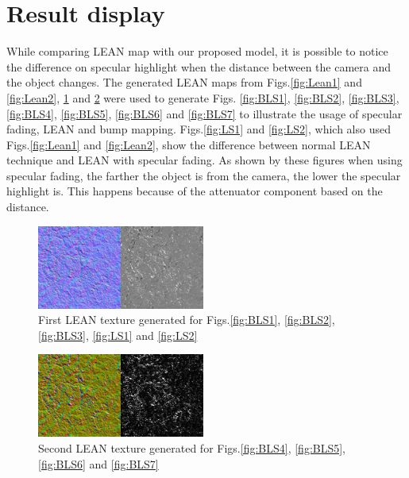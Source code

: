 \documentclass[10pt, conference]{IEEEtran}
\begin{document}
\section{Result display}
\label{sec:results}
%
While comparing LEAN map with our proposed model, it is possible to notice the difference on specular highlight when the distance between the camera and the object changes. The generated LEAN maps from Figs.\ref{fig:Lean1} and \ref{fig:Lean2}, \ref{fig:Lean21} and \ref{fig:Lean22} were used to generate Figs. \ref{fig:BLS1}, \ref{fig:BLS2}, \ref{fig:BLS3}, \ref{fig:BLS4}, \ref{fig:BLS5}, \ref{fig:BLS6} and \ref{fig:BLS7} to illustrate the usage of specular fading, LEAN and bump mapping. Figs.\ref{fig:LS1} and \ref{fig:LS2}, which also used Figs.\ref{fig:Lean1} and \ref{fig:Lean2}, show the difference between normal LEAN technique and LEAN with specular fading. As shown by these figures when using specular fading, the farther the object is from the camera, the lower the specular highlight is. This happens because of the attenuator component based on the distance.
\begin{figure}[here]
	\includegraphics[width=0.49\textwidth]{figs/Lean21.png}
	\caption{First LEAN texture generated for Figs.\ref{fig:BLS1}, \ref{fig:BLS2}, \ref{fig:BLS3}, \ref{fig:LS1} and \ref{fig:LS2}}
	\label{fig:Lean21}
\end{figure}

\begin{figure}[here]
	\includegraphics[width=0.49\textwidth]{figs/Lean22.png}
	\caption{Second LEAN texture generated for Figs.\ref{fig:BLS4}, \ref{fig:BLS5}, \ref{fig:BLS6} and \ref{fig:BLS7}}
	\label{fig:Lean22}
\end{figure}
\end{document}
